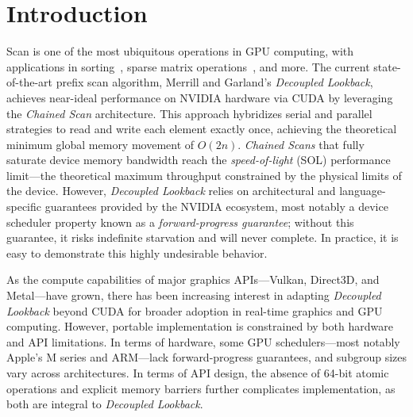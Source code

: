 \documentclass[acmsmall, manuscript, screen, review, anonymous]{acmart}
\begin{document}



\maketitle

\section{Introduction}
Scan is one of the most ubiquitous operations in GPU computing, with applications in sorting~\cite{adinets2022onesweepfastersignificantdigit}, sparse matrix operations~\cite{BellGarland2009}, and more. The current state-of-the-art prefix scan algorithm, Merrill and Garland's \emph{Decoupled Lookback}, achieves near-ideal performance on NVIDIA hardware via CUDA by leveraging the \emph{Chained Scan} architecture. This approach hybridizes serial and parallel strategies to read and write each element exactly once, achieving the theoretical minimum global memory movement of $O(2n)$. \emph{Chained Scans} that fully saturate device memory bandwidth reach the \emph{speed-of-light} (SOL) performance limit---the theoretical maximum throughput constrained by the physical limits of the device. However, \emph{Decoupled Lookback} relies on architectural and language-specific guarantees provided by the NVIDIA ecosystem, most notably a device scheduler property known as a \emph{forward-progress guarantee}; without this guarantee, it risks indefinite starvation and will never complete. In practice, it is easy to demonstrate this highly undesirable behavior.

As the compute capabilities of major graphics APIs---Vulkan, Direct3D, and Metal---have grown, there has been increasing interest in adapting \emph{Decoupled Lookback} beyond CUDA for broader adoption in real-time graphics and GPU computing. However, portable implementation is constrained by both hardware and API limitations. In terms of hardware, some GPU schedulers---most notably Apple's M series and ARM---lack forward-progress guarantees, and subgroup sizes vary across architectures. In terms of API design, the absence of 64-bit atomic operations and explicit memory barriers further complicates implementation, as both are integral to \emph{Decoupled Lookback}.
\end{document}
